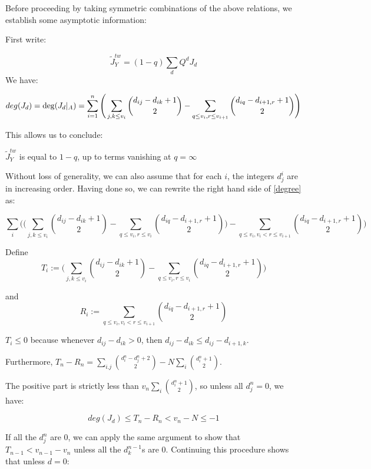 \documentclass[11pt,letterpaper]{amsart}
\begin{document}
Before proceeding by taking symmetric combinations of the above relations, we establish some asymptotic information:

First write:


$$\tilde{J}^{tw}_Y=(1-q)\sum_d Q^d J_d$$
We have: 


\begin{equation}
\label{degree}
 deg(J_d)= \deg(J_d|_A)=\sum_{i=1}^n \Bigg(\sum_{j,k\leq v_i} \binom{d_{ij}-d_{ik}+1}{2}-\sum_{q\leq v_i,r\leq v_{i+1}}\binom{d_{iq}-d_{i+1,r}+1}{2}\Bigg)
\\
\end{equation}





This allows us to conclude:

\begin{lem}
$\tilde{J}^{tw}_Y$ is equal to $1-q$, up to terms vanishing at $q=\infty$
\end{lem}


Without loss of generality, we can also assume that for each $i$, the integers $d^i_j$ are in increasing order. Having done so, we can rewrite the right hand side of \eqref{degree} as:

 $$\sum_{i} \Bigg(\big(\sum_{j,k\leq v_i} \binom{d_{ij}-d_{ik}+1}{2}-\sum_{q\leq v_i,r\leq v_{i}}\binom{d_{iq}-d_{i+1,r}+1}{2}\big)-\sum_{q\leq v_i, v_i<r\leq v_{i+1}} \binom{d_{iq}-d_{i+1,r}+1}{2}\Bigg)$$

  Define $$T_i:=\big(\sum_{j,k\leq v_i} \binom{d_{ij}-d_{ik}+1}{2}-\sum_{q\leq v_i,r\leq v_{i}}\binom{d_{iq}-d_{i+1,r}+1}{2}\big)$$
  
  and 
  $$R_i:=\sum_{q\leq v_i, v_i<r\leq v_{i+1}} \binom{d_{iq}-d_{i+1,r}+1}{2}$$
  
  $T_i\leq 0$ because whenever $d_{ij}-d_{ik}>0$, then $d_{ij}-d_{ik}\leq d_{ij}-d_{i+1,k}$.

Furthermore, $T_{n}-R_n=\sum_{i.j}\binom{d^n_i-d^n_j+2}{2}-N\sum_{i}\binom{d^n_i+1}{2}$. 

The positive part is strictly less than $v_n\sum_{i}\binom{d^n_i+1}{2}$, so unless all $d^n_j=0$, we have:

$$deg(J_d)\leq T_n-R_n< v_n-N\leq -1$$

If all the $d^n_j$ are 0, we can apply the same argument to show that $T_{n-1}<v_{n-1}-v_n$ unless all the $d^{n-1}_k$s are 0. Continuing this procedure shows that unless $d=0$: 
\end{document}

